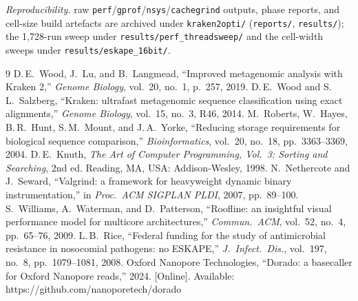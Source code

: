 \documentclass[10.5pt]{article}
\newcommand{\code}[1]{\texttt{\footnotesize #1}}
\begin{document}
{\footnotesize\textit{Reproducibility.} raw \code{perf}/\code{gprof}/\code{nsys}/\code{cachegrind} outputs, phase reports, and cell-size build artefacts are archived under \code{kraken2opti/} (\code{reports/}, \code{results/}); the 1{,}728-run sweep under \code{results/perf\_threadsweep/} and the cell-width sweeps under \code{results/eskape\_16bit/}.}

\begin{thebibliography}{9}
\footnotesize
{} D.\,E.\ Wood, J.\ Lu, and B.\ Langmead, ``Improved metagenomic analysis with Kraken 2,'' \textit{Genome Biology}, vol.\ 20, no.\ 1, p.\ 257, 2019.
 D.\,E.\ Wood and S.\,L.\ Salzberg, ``Kraken: ultrafast metagenomic sequence classification using exact alignments,'' \textit{Genome Biology}, vol.\ 15, no.\ 3, R46, 2014.
 M.\ Roberts, W.\ Hayes, B.\,R.\ Hunt, S.\,M.\ Mount, and J.\,A.\ Yorke, ``Reducing storage requirements for biological sequence comparison,'' \textit{Bioinformatics}, vol.\ 20, no.\ 18, pp.\ 3363--3369, 2004.
 D.\,E.\ Knuth, \textit{The Art of Computer Programming, Vol.\ 3: Sorting and Searching}, 2nd ed. Reading, MA, USA: Addison-Wesley, 1998.
 N.\ Nethercote and J.\ Seward, ``Valgrind: a framework for heavyweight dynamic binary instrumentation,'' in \textit{Proc.\ ACM SIGPLAN PLDI}, 2007, pp.\ 89--100.
 S.\ Williams, A.\ Waterman, and D.\ Patterson, ``Roofline: an insightful visual performance model for multicore architectures,'' \textit{Commun.\ ACM}, vol.\ 52, no.\ 4, pp.\ 65--76, 2009.
 L.\,B.\ Rice, ``Federal funding for the study of antimicrobial resistance in nosocomial pathogens: no ESKAPE,'' \textit{J.\ Infect.\ Dis.}, vol.\ 197, no.\ 8, pp.\ 1079--1081, 2008.
 Oxford Nanopore Technologies, ``Dorado: a basecaller for Oxford Nanopore reads,'' 2024. [Online]. Available: https://github.com/nanoporetech/dorado
\end{thebibliography}
\end{document}
